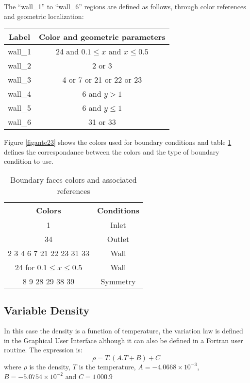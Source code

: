 The ``wall\_1'' to ``wall\_6'' regions are defined as follows, through color
references and geometric localization:
\begin{center}
\begin{tabular}{|c|c|}
\hline
Label & Color and geometric parameters \\
\hline
\hline
wall\_1 & 24 and $0.1\leqslant x$ and $x\leqslant 0.5$ \\
\hline
wall\_2 & 2 or 3 \\
\hline
wall\_3 & 4 or 7 or 21 or 22 or 23 \\
\hline
wall\_4 & 6 and $y > 1$ \\
\hline
wall\_5 & 6 and $y\leqslant1$ \\
\hline
wall\_6 & 31 or 33 \\
\hline
\end{tabular}
\end{center}

Figure \ref{figante23} shows the colors used for boundary conditions and
table \ref{tabante41} defines the correspondance between the colors and
the type of boundary condition to use.

\begin{table}[htp]
\begin{center}
\begin{tabular}{|c|c|}
\hline
Colors & Conditions \\
\hline
1 & Inlet \\
\hline
34 & Outlet \\
\hline
2 3 4 6 7 21 22 23 31 33 & Wall \\
\hline
24 for $0.1 \leq x \leq 0.5$ & Wall \\
\hline
8 9 28 29 38 39 & Symmetry \\
\hline
\end{tabular}
\caption{Boundary faces colors and associated references}
\label{tabante41}
\end{center}
\end{table}

        \subsection{Variable Density}
In this case the density is a function of temperature, the variation law is defined
 in the Graphical User Interface although it can also be defined in a Fortran user
routine. The expression is:
\begin{equation}
\rho = T.(A.T + B) + C
\end{equation}
where $\rho$ is the density, $T$ is the temperature, $A = -4.0668\times10^{-3}$,
$B =-5.0754\times 10^{-2}$ and $C = 1\,000.9$

